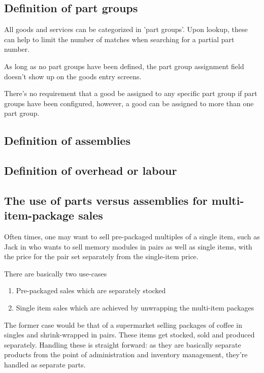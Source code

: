 \subsection{Definition of part groups}
\label{subsec-parts-groups}

All goods and services can be categorized in 'part groups'. Upon lookup, these can
help to limit the number of matches when searching for a partial part number.

As long as no part groups have been defined, the part group assignment field doesn't
show up on the goods entry screens.

There's no requirement that a good be assigned to any specific part group if part
groups have been configured, however, a good can be assigned to more than one part group.

\subsection{Definition of assemblies}
\label{subsec-assemblies-definition}


\subsection{Definition of overhead or labour}
\label{subsec-overhead-definition}

\subsection{The use of parts versus assemblies for multi-item-package sales}
\label{subsec-parts-versus-assemblies}

Often times, one may want to sell pre-packaged multiples of a single item, such as Jack
in  who wants to sell memory modules in pairs as well as
single items, with the price for the pair set separately from the single-item price.

There are basically two use-cases

\begin{enumerate}
\item Pre-packaged sales which are separately stocked
\item Single item sales which are achieved by unwrapping the multi-item packages
\end{enumerate}

The former case would be that of a supermarket selling packages of coffee in
singles and shrink-wrapped in pairs. These items get stocked, sold and produced separately.
Handling these is straight forward: as they are basically separate products from the point
of administration and inventory management, they're handled as separate parts.

